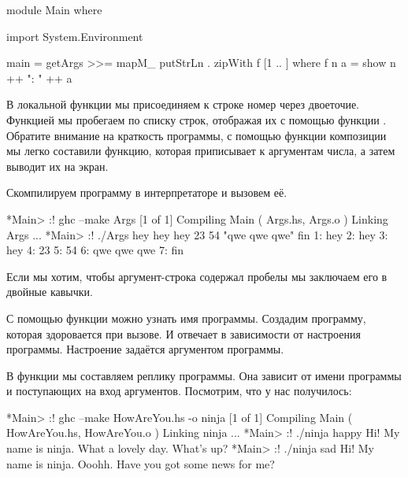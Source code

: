\begin{code}
module Main where

import System.Environment

main = getArgs >>= mapM_ putStrLn . zipWith f [1 .. ]
    where f n a = show n ++ ": " ++ a
\end{code}

В локальной функции  мы присоединяем к строке номер
через двоеточие. Функцией  мы пробегаем по списку
строк, отображая их с помощью функции . 
Обратите внимание на краткость программы, с помощью функции композиции
мы легко составили функцию, которая приписывает к аргументам
числа, а затем выводит их на экран.

Скомпилируем программу в интерпретаторе и вызовем её.

\begin{code}
*Main> :! ghc --make Args
[1 of 1] Compiling Main             ( Args.hs, Args.o )
Linking Args ...
*Main> :! ./Args hey hey hey 23 54 "qwe qwe qwe" fin
1: hey
2: hey
3: hey
4: 23
5: 54
6: qwe qwe qwe
7: fin
\end{code}

Если мы хотим, чтобы аргумент-строка содержал пробелы мы 
заключаем его в двойные кавычки. 


С помощью функции  можно узнать имя программы.
Создадим программу, которая здоровается при вызове. И отвечает
в зависимости от настроения программы. Настроение
задаётся аргументом программы. 


В функции  мы составляем реплику программы.
Она зависит от имени программы и поступающих на
вход аргументов. Посмотрим, что у нас получилось:

\begin{code}
*Main> :! ghc --make HowAreYou.hs -o ninja 
[1 of 1] Compiling Main             ( HowAreYou.hs, HowAreYou.o )
Linking ninja ...
*Main> :! ./ninja happy
Hi! My name is ninja.
What a lovely day. What's up?
*Main> :! ./ninja sad
Hi! My name is ninja.
Ooohh. Have you got some news for me?
\end{code}

